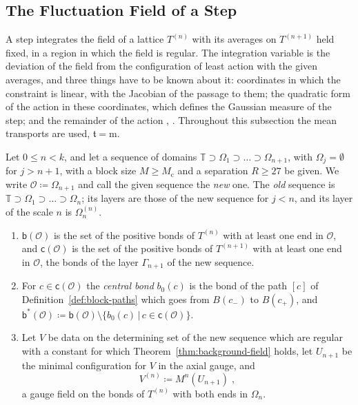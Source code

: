\documentclass[11pt]{preprint}
\numberwithin{equation}{section}
\begin{document}
\subsection{The Fluctuation Field of a Step}\label{sec:fluctuation-field}

A step integrates the field of a lattice $T^{(n)}$ with its averages on $T^{(n+1)}$ held fixed, in a region in which the field is regular. The integration variable is the deviation of the field from the configuration of least action with the given averages, and three things have to be known about it: coordinates in which the constraint is linear, with the Jacobian of the passage to them; the quadratic form of the action in these coordinates, which defines the Gaussian measure of the step; and the remainder of the action \cite[Sect.~2]{BalabanRG1}, \cite[Sect.~E]{BalabanPBG}. Throughout this subsection the mean transports are used, $\mathfrak t = \mathrm m$.

\begin{definition}\label{def:step-setting}
Let $0 \leqslant n < k$, and let a sequence of domains $\mathbb T \supset \Omega_1 \supset \dots \supset \Omega_{n+1}$, with $\Omega_j = \emptyset$ for $j > n + 1$, with a block size $M \geqslant M_{\mathrm c}$ and a separation $R \geqslant 27$ be given. We write $\mathcal O \coloneqq \Omega_{n+1}$ and call the given sequence the \emph{new} one. The \emph{old} sequence is $\mathbb T \supset \Omega_1 \supset \dots \supset \Omega_n$; its layers are those of the new sequence for $j < n$, and its layer of the scale $n$ is $\Omega_n^{(n)}$.
\begin{enumerate}[label=(\roman*)]
\item $\mathsf b(\mathcal O)$ is the set of the positive bonds of $T^{(n)}$ with at least one end in $\mathcal O$, and $\mathsf c(\mathcal O)$ is the set of the positive bonds of $T^{(n+1)}$ with at least one end in $\mathcal O$, the bonds of the layer $\Gamma_{n+1}$ of the new sequence.
\item For $c \in \mathsf c(\mathcal O)$ the \emph{central bond} $b_0(c)$ is the bond of the path $[c]$ of Definition~\ref{def:block-paths} which goes from $B(c_-)$ to $B(c_+)$, and $\mathsf b^*(\mathcal O) \coloneqq \mathsf b(\mathcal O) \setminus \{ b_0(c) \,|\, c \in \mathsf c(\mathcal O) \}$.
\item Let $V$ be data on the determining set of the new sequence which are regular with a constant for which Theorem~\ref{thm:background-field} holds, let $U_{n+1}$ be the minimal configuration for $V$ in the axial gauge, and
\begin{equation}\label{eq:evaluation-field}
    V^{(n)} \coloneqq M^n(U_{n+1})\;,
\end{equation}
a gauge field on the bonds of $T^{(n)}$ with both ends in $\Omega_n$.
\end{enumerate}
\end{definition}
\end{document}
